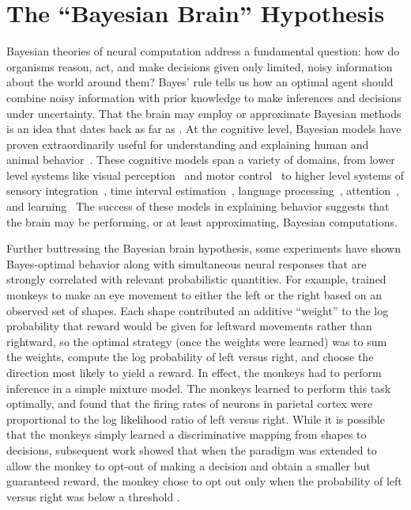 \section{The ``Bayesian Brain'' Hypothesis}
\label{sec:bayesian_brain}
Bayesian theories of neural computation address a fundamental
question: how do organisms reason, act, and make decisions given only
limited, noisy information about the world around them?  Bayes' rule
tells us how an optimal agent should combine noisy information with
prior knowledge to make inferences and decisions under uncertainty.
That the brain may employ or approximate Bayesian methods is an idea
that dates back as far as \citet{helmholtz1925treatise}.  At the
cognitive level, Bayesian models have proven extraordinarily useful
for understanding and explaining human and animal
behavior~\citep{tenenbaum2011grow, griffiths2008bayesian}. These
cognitive models span a variety of domains, from lower level systems
like visual perception~\citep{knill1996perception,
  brainard1997bayesian, weiss2002motion, yuille2006vision,
  Stocker2006, Simoncelli2009} and motor control~\citep{Kording2004} to
higher level systems of sensory integration~\citep{ernst2002humans},
time interval estimation~\citep{jazayeri2010temporal}, 
language processing~\citep{chater2006probabilistic},
attention~\citep{whiteley2012attention, chikkerur2010,
  dayan2010selective}, and learning~\citep{tenenbaum2006theory,
  courville2006bayesian} The success of these models in explaining
behavior suggests that the brain may be performing, or at least
approximating, Bayesian computations.

Further buttressing the Bayesian brain hypothesis, some experiments
have shown Bayes-optimal behavior along with simultaneous neural responses
that are strongly correlated with relevant probabilistic quantities.
For example, \citet{Yang2007} trained monkeys to make an eye movement
to either the left or the right based on an observed set of shapes.
Each shape contributed an additive ``weight'' to the log probability
that reward would be given for leftward movements rather than
rightward, so the optimal strategy (once the weights were
learned) was to sum the weights, compute the log probability of left
versus right, and choose the direction most likely to yield a
reward.  In effect, the monkeys had to perform inference in a simple
mixture model. The monkeys learned to perform this task optimally, and
\citet{Yang2007} found that the firing rates of neurons in parietal
cortex were proportional to the log likelihood ratio of left versus
right. While it is possible that the monkeys simply learned a
discriminative mapping from shapes to decisions, subsequent work
showed that when the paradigm was extended to allow the monkey to
opt-out of making a decision and obtain a smaller but guaranteed
reward, the monkey chose to opt out only when the probability of
left versus right was below a threshold \citep{Kiani2009}.

